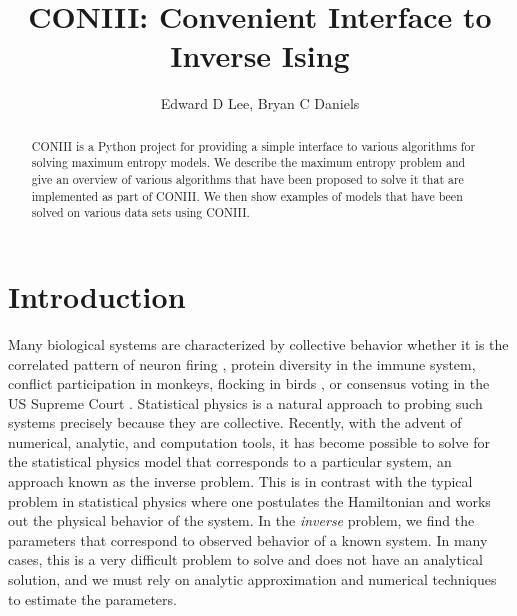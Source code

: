 \documentclass[aps,prl,twocolumn]{revtex4-1}
\begin{document}
\newcommand{\mr}[1]{\mathrm{#1}}
\newcommand{\mb}[1]{\mathbf{#1}}
\newcommand{\br}[1]{\left<#1\right>}
\newcommand{\bl}[1]{\left|#1\right|}
\newcommand{\mc}[1]{\mathcal{#1}}
\newcommand{\tb}[1]{\textcolor{blue}{#1}}
\newcommand{\tr}[1]{\textcolor{red}{#1}}
\newcommand{\tg}[1]{\textcolor{green}{#1}}
\newcommand{\si}[0]{\sigma_{\rm i}}
\newcommand{\sj}[0]{\sigma_{\rm j}}

\title{CONIII: Convenient Interface to Inverse Ising}
\author{Edward D Lee, Bryan C Daniels}

\begin{abstract}
CONIII is a Python project for providing a simple interface to various algorithms for solving maximum entropy models. We describe the maximum entropy problem and give an overview of various algorithms that have been proposed to solve it that are implemented as part of CONIII. We then show examples of models that have been solved on various data sets using CONIII.
\end{abstract}

\maketitle

\section{Introduction}
Many biological systems are characterized by collective behavior whether it is the correlated pattern of neuron firing \cite{Schneidman:2006he}, protein diversity in the immune system, conflict participation in monkeys, flocking in birds \cite{Bialek:2012cs}, or consensus voting in the US Supreme Court \cite{Lee:2015ev}. Statistical physics is a natural approach to probing such systems precisely because they are collective.
Recently, with the advent of numerical, analytic, and computation tools, it has become possible to solve for the statistical physics model that corresponds to a particular system, an approach known as the inverse problem.
This is in contrast with the typical problem in statistical physics where one postulates the Hamiltonian and works out the physical behavior of the system. In the \textit{inverse} problem, we  find the parameters that correspond to observed behavior of a known system. In many cases, this is a very difficult problem to solve and does not have an analytical solution, and we must rely on analytic approximation and numerical techniques to estimate the parameters.
\end{document}
